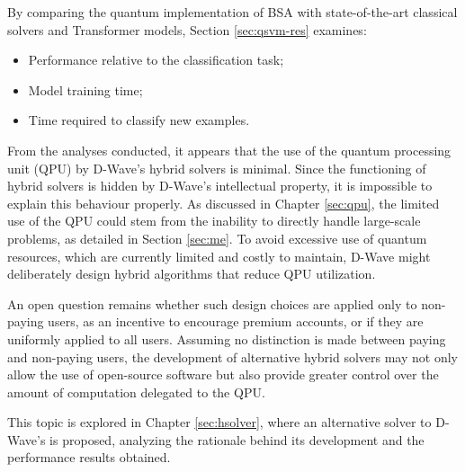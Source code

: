 By comparing the quantum implementation of BSA with state-of-the-art classical solvers and Transformer models, Section \ref{sec:qsvm-res} examines:
\begin{itemize}
    \item Performance relative to the classification task;
    \item Model training time;
    \item Time required to classify new examples.
\end{itemize}

From the analyses conducted, it appears that the use of the quantum processing unit (QPU) by D-Wave’s hybrid solvers is minimal.
Since the functioning of hybrid solvers is hidden by D-Wave’s intellectual property, it is impossible to explain this behaviour properly.
As discussed in Chapter \ref{sec:qpu}, the limited use of the QPU could stem from the inability to directly handle large-scale problems, as detailed in Section \ref{sec:me}.
To avoid excessive use of quantum resources, which are currently limited and costly to maintain, D-Wave might deliberately design hybrid algorithms that reduce QPU utilization.

An open question remains whether such design choices are applied only to non-paying users, as an incentive to encourage premium accounts, or if they are uniformly applied to all users.
Assuming no distinction is made between paying and non-paying users, the development of alternative hybrid solvers may not only allow the use of open-source software but also provide greater control over the amount of computation delegated to the QPU.

This topic is explored in Chapter \ref{sec:hsolver}, where an alternative solver to D-Wave's is proposed, analyzing the rationale behind its development and the performance results obtained.
